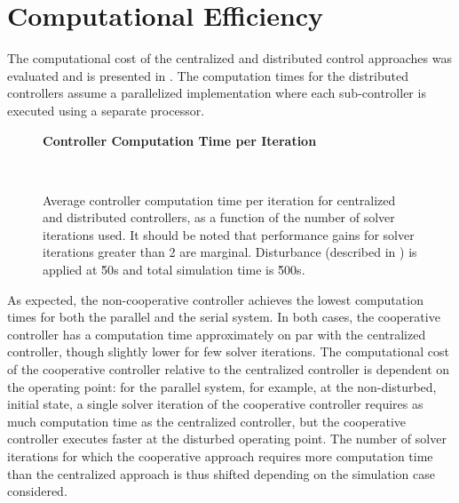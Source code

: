 \section{Computational Efficiency}
\label{sec:results:computation}
\makeplotstrue

The computational cost of the centralized and distributed control approaches was evaluated and is presented in .
The computation times for the distributed controllers assume a parallelized implementation where each sub-controller is executed using a separate processor. 

\ifmakeplots
\begin{figure}
  \centering
  {\large\bfseries Controller Computation Time per Iteration\\}
  \begin{subfigure}{0.75\linewidth}
    
  \end{subfigure}
  \\
  \begin{subfigure}{0.75\linewidth}
    
  \end{subfigure}
  \caption{Average controller computation time per iteration for centralized and distributed controllers, as a function of the number of solver iterations used. It should be noted that performance gains for solver iterations greater than 2 are marginal. Disturbance (described in ) is applied at \u{50}{s} and total simulation time is \u{500}{s}.}
  \label{fig:results:compcost}
\end{figure}

\fi


As expected, the non-cooperative controller achieves the lowest computation times for both the parallel and the serial system.
In both cases, the cooperative controller has a computation time approximately on par with the centralized controller, though slightly lower for few solver iterations.
The computational cost of the cooperative controller relative to the centralized controller is dependent on the operating point: for the parallel system, for example, at the non-disturbed, initial state, a single solver iteration of the cooperative controller requires as much computation time as the centralized controller, but the cooperative controller executes faster at the disturbed operating point.
The number of solver iterations for which the cooperative approach requires more computation time than the centralized approach is thus shifted depending on the simulation case considered.

